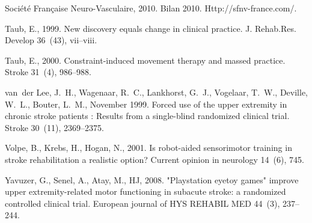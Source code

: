 \documentclass[preprint,authoryear,12pt]{elsarticle}
\begin{document}
\begin{thebibliography}{40}
{Soci\'et\'e Fran\c{c}aise Neuro-Vasculaire}, 2010. Bilan 2010.
  Http://sfnv-france.com/.

Taub, E., 1999. New discovery equals change in clinical practice. J. Rehab.Res.
  Develop 36~(43), vii--viii.

Taub, E., 2000. Constraint-induced movement therapy and massed practice. Stroke
  31~(4), 986--988.

van~der Lee, J.~H., Wagenaar, R.~C., Lankhorst, G.~J., Vogelaar, T.~W.,
  Deville, W.~L., Bouter, L.~M., November 1999. Forced use of the upper
  extremity in chronic stroke patients : Results from a single-blind randomized
  clinical trial. Stroke 30~(11), 2369--2375.

Volpe, B., Krebs, H., Hogan, N., 2001. {Is robot-aided sensorimotor training in
  stroke rehabilitation a realistic option?} Current opinion in neurology
  14~(6), 745.

Yavuzer, G., Senel, A., Atay, M., HJ, 2008. {"Playstation eyetoy games" improve
  upper extremity-related motor functioning in subacute stroke: a randomized
  controlled clinical trial}. European journal of HYS REHABIL MED 44~(3),
  237--244.

\end{thebibliography}
\end{document}
